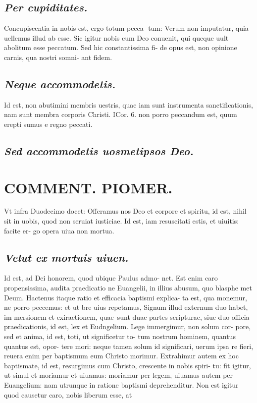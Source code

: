 \documentclass{article}
\begin{document}
\begin{pages}
\subsection*{\textit{Per cupiditates. }}\pstart Concupiscentia in nobis est, ergo totum pecca- tum: Verum non imputatur, quia uellemus illud ab esse. Sic igitur nobis cum Deo conuenit, qui queque  uult abolitum esse peccatum. Sed hic constantissima fi- de opus est, non opinione carnis, qua nostri somni- ant fidem.   \pend
{}
{}
\subsection*{\textit{Neque accommodetis. }}\pstart Id est, non abutimini membris uestris, quae iam sunt instrumenta sanctificationis, nam sunt membra corporis Christi. ICor. 6. non porro peccandum est, quum erepti sumus e regno peccati.   \pend
{}
{}
\subsection*{\textit{Sed accommodetis uosmetipsos Deo. }}
\section*{COMMENT. PIOMER.  }\pstart Vt infra Duodecimo docet: Offeramus nos Deo et corpore et spiritu, id est, nihil sit in uobis, quod non seruiat iusticiae.   \pend\pstart Id est, iam resuscitati estis, et uiuitis: facite er- go opera uiua non mortua.   \pend
{}
{}
\subsection*{\textit{Velut ex mortuis uiuen. }}\pstart Id est, ad Dei honorem, quod ubique Paulus admo- net. Est enim caro propensissima, audita praedicatio ne Euangelii, in illius abusum, quo blasphe met Deum.  Hactenus itaque ratio et efficacia baptismi explica- ta est, qua monemur, ne porro peccemus: et ut bre uius repetamus, Signum illud externum duo habet, im mersionem et exiractionem, quae sunt duae partes scripturae, siue duo officia praedicationis, id est, lex et Eudngelium. Lege immergimur, non solum cor- pore, sed et anima, id est, toti, ut significetur to- tum nostrum hominem, quantus quantus est, opor- tere mori: neque tamen solum id significari, uerum ipsa re fieri, reuera enim per baptismum eum Christo morimur. Extrahimur autem ex hoc baptismate, id est, resurgimus cum Christo, crescente in nobis spiri- tu: fit igitur, ut simul et moriamur et uiuamus: moriamur per legem, uiuamus autem per Euangelium: nam utrunque in ratione baptismi deprehenditur. Non est igitur quod causetur caro, nobis liberum esse, at  \pend
{}
{}

\end{pages}
\end{document}
